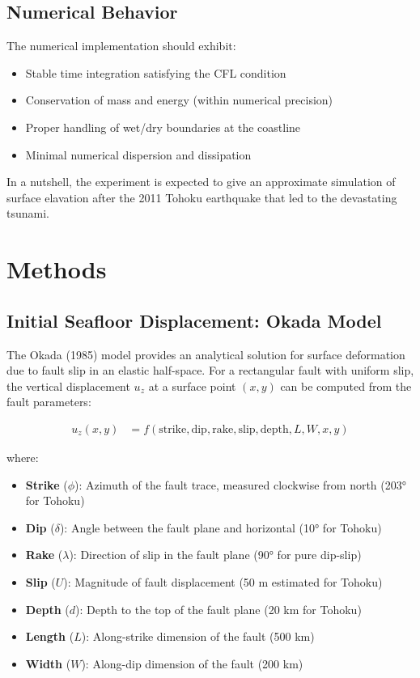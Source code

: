 \documentclass[12pt]{article}
\begin{document}
\subsection{Numerical Behavior}
The numerical implementation should exhibit:
\begin{itemize}
    \item Stable time integration satisfying the CFL condition
    \item Conservation of mass and energy (within numerical precision)
    \item Proper handling of wet/dry boundaries at the coastline
    \item Minimal numerical dispersion and dissipation
\end{itemize}

In a nutshell, the experiment is expected to give an approximate simulation of surface elavation after the 2011 Tohoku earthquake that led to the devastating tsunami.

\section{Methods}

\subsection{Initial Seafloor Displacement: Okada Model}

The Okada (1985) model provides an analytical solution for surface deformation due to fault slip in an elastic half-space. For a rectangular fault with uniform slip, the vertical displacement $u_z$ at a surface point $(x, y)$ can be computed from the fault parameters:

\begin{align}
u_z(x, y) &= f(\text{strike}, \text{dip}, \text{rake}, \text{slip}, \text{depth}, L, W, x, y)
\end{align}

where:
\begin{itemize}
    \item \textbf{Strike} ($\phi$): Azimuth of the fault trace, measured clockwise from north (203° for Tohoku)
    \item \textbf{Dip} ($\delta$): Angle between the fault plane and horizontal (10° for Tohoku)
    \item \textbf{Rake} ($\lambda$): Direction of slip in the fault plane (90° for pure dip-slip)
    \item \textbf{Slip} ($U$): Magnitude of fault displacement (50 m estimated for Tohoku)
    \item \textbf{Depth} ($d$): Depth to the top of the fault plane (20 km for Tohoku)
    \item \textbf{Length} ($L$): Along-strike dimension of the fault (500 km)
    \item \textbf{Width} ($W$): Along-dip dimension of the fault (200 km)
\end{itemize}
\end{document}
